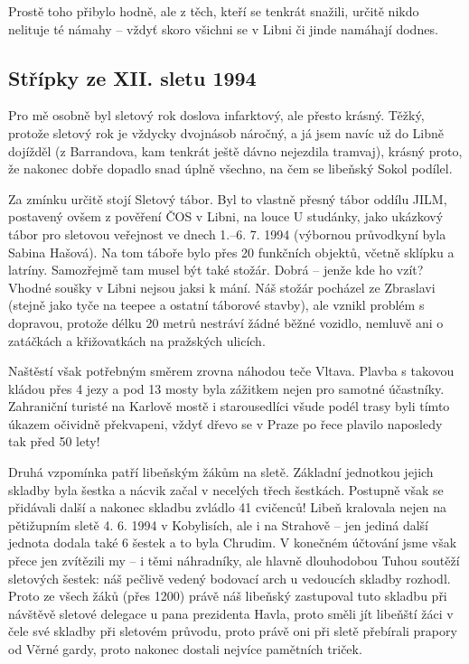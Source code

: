 Prostě toho přibylo hodně, ale z těch, kteří se tenkrát snažili, určitě
nikdo nelituje té námahy -- vždyť skoro všichni se v Libni či jinde
namáhají dodnes.

\subsection{Střípky ze XII. sletu
1994}\label{stux159uxedpky-ze-xii.-sletu-1994}

Pro mě osobně byl sletový rok doslova infarktový, ale přesto krásný.
Těžký, protože sletový rok je vždycky dvojnásob náročný, a já jsem navíc
už do Libně dojížděl (z Barrandova, kam tenkrát ještě dávno nejezdila
tramvaj), krásný proto, že nakonec dobře dopadlo snad úplně všechno, na
čem se libeňský Sokol podílel.

Za zmínku určitě stojí Sletový tábor. Byl to vlastně přesný tábor oddílu
JILM, postavený ovšem z pověření ČOS v Libni, na louce U studánky, jako
ukázkový tábor pro sletovou veřejnost ve dnech 1.--6. 7. 1994 (výbornou
průvodkyní byla Sabina Hašová). Na tom táboře bylo přes 20 funkčních
objektů, včetně sklípku a latríny. Samozřejmě tam musel být také stožár.
Dobrá -- jenže kde ho vzít? Vhodné soušky v Libni nejsou jaksi k mání.
Náš stožár pocházel ze Zbraslavi (stejně jako tyče na teepee a ostatní
táborové stavby), ale vznikl problém s dopravou, protože délku 20 metrů
nestráví žádné běžné vozidlo, nemluvě ani o zatáčkách a křižovatkách na
pražských ulicích.

Naštěstí však potřebným směrem zrovna náhodou teče Vltava. Plavba s
takovou kládou přes 4 jezy a pod 13 mosty byla zážitkem nejen pro
samotné účastníky. Zahraniční turisté na Karlově mostě i starousedlíci
všude podél trasy byli tímto úkazem očividně překvapeni, vždyť dřevo se
v Praze po řece plavilo naposledy tak před 50 lety!

Druhá vzpomínka patří libeňským žákům na sletě. Základní jednotkou
jejich skladby byla šestka a nácvik začal v necelých třech šestkách.
Postupně však se přidávali další a nakonec skladbu zvládlo 41 cvičenců!
Libeň kralovala nejen na pětižupním sletě 4. 6. 1994 v Kobylisích, ale i
na Strahově -- jen jediná další jednota dodala také 6 šestek a to byla
Chrudim. V konečném účtování jsme však přece jen zvítězili my -- i těmi
náhradníky, ale hlavně dlouhodobou Tuhou soutěží sletových šestek: náš
pečlivě vedený bodovací arch u vedoucích skladby rozhodl. Proto ze všech
žáků (přes 1200) právě náš libeňský zastupoval tuto skladbu při návštěvě
sletové delegace u pana prezidenta Havla, proto směli jít libeňští žáci
v čele své skladby při sletovém průvodu, proto právě oni při sletě
přebírali prapory od Věrné gardy, proto nakonec dostali nejvíce
pamětních triček.

